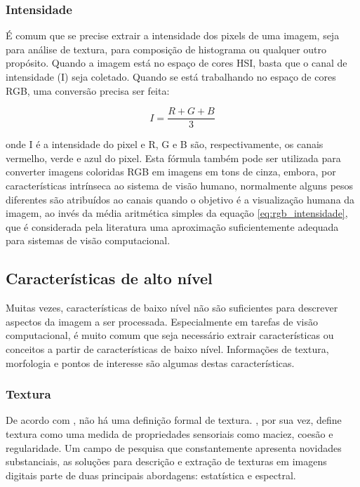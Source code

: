 \subsubsection*{Intensidade}

É comum que se precise extrair a intensidade dos pixels de uma imagem, seja para análise de textura, para composição de histograma ou qualquer outro propósito. Quando a imagem está no espaço de cores HSI, basta que o canal de intensidade (I) seja coletado. Quando se está trabalhando no espaço de cores RGB, uma conversão precisa ser feita:

\begin{equation}
	\displaystyle I = \frac{R + G + B}{3}
	\label{eq:rgb_intensidade}
\end{equation}

onde I é a intensidade do pixel e R, G e B são, respectivamente, os canais vermelho, verde e azul do pixel. Esta fórmula também pode ser utilizada para converter imagens coloridas RGB em imagens em tons de cinza, embora, por características intrínseca ao sistema de visão humano, normalmente alguns pesos diferentes são atribuídos ao canais quando o objetivo é a visualização humana da imagem, ao invés da média aritmética simples da equação \ref{eq:rgb_intensidade}, que é considerada pela literatura uma aproximação suficientemente adequada para sistemas de visão computacional.

\subsection{Características de alto nível}

Muitas vezes, características de baixo nível não são suficientes para descrever aspectos da imagem a ser processada. Especialmente em tarefas de visão computacional, é muito comum que seja necessário extrair características ou conceitos a partir de características de baixo nível. Informações de textura, morfologia e pontos de interesse são algumas destas características.

\subsubsection*{Textura}

De acordo com , não há uma definição formal de textura. , por sua vez, define textura como uma medida de propriedades sensoriais como maciez, coesão e regularidade. Um campo de pesquisa que constantemente apresenta novidades substanciais, as soluções para descrição e extração de texturas em imagens digitais parte de duas principais abordagens: estatística e  espectral.

